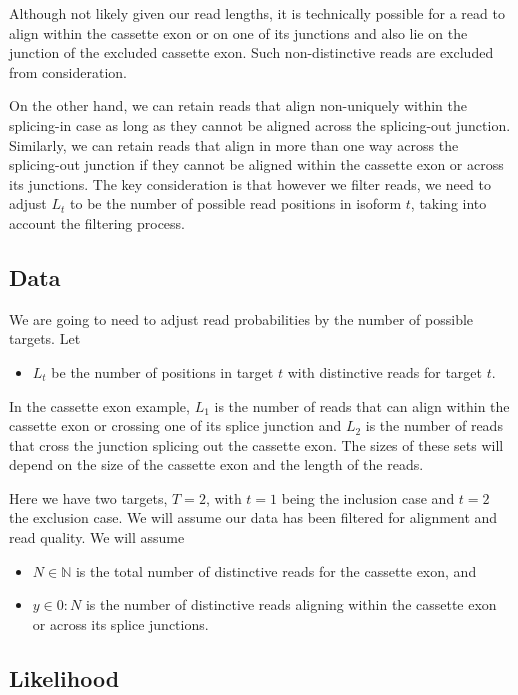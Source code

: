 \documentclass[11pt]{report}
\begin{document}
Although not likely given our read lengths, it is technically possible
for a read to align within the cassette exon or on one of its
junctions and also lie on the junction of the excluded cassette exon.
Such non-distinctive reads are excluded from consideration.

On the other hand, we can retain reads that align non-uniquely within
the splicing-in case as long as they cannot be aligned across the
splicing-out junction. Similarly, we can retain reads that align in
more than one way across the splicing-out junction if they cannot be
aligned within the cassette exon or across its junctions. The key
consideration is that however we filter reads, we need to adjust $L_t$
to be the number of possible read positions in isoform $t$, taking
into account the filtering process.

\subsection{Data}

We are going to need to adjust read probabilities by the number of
possible targets.  Let
%
\begin{itemize}
\item $L_t$ be the number of positions in target $t$ with distinctive
  reads for target $t$.
\end{itemize}
%
In the cassette exon example, $L_1$ is the number of reads that can
align within the cassette exon or crossing one of its splice junction
and $L_2$ is the number of reads that cross the junction splicing out
the cassette exon. The sizes of these sets will depend on the size of
the cassette exon and the length of the reads.

Here we have two targets, $T = 2$, with $t = 1$ being the inclusion
case and $t = 2$ the exclusion case.  We will assume our data has been
filtered for alignment and read quality.  We will assume
%
\begin{itemize}
\item $N \in \mathbb{N}$ is the total number of distinctive reads for
  the cassette exon, and
\item $y \in 0{:}N$ is the number of distinctive reads aligning within
  the cassette exon or across its splice junctions.
\end{itemize}

\subsection{Likelihood}
\end{document}
